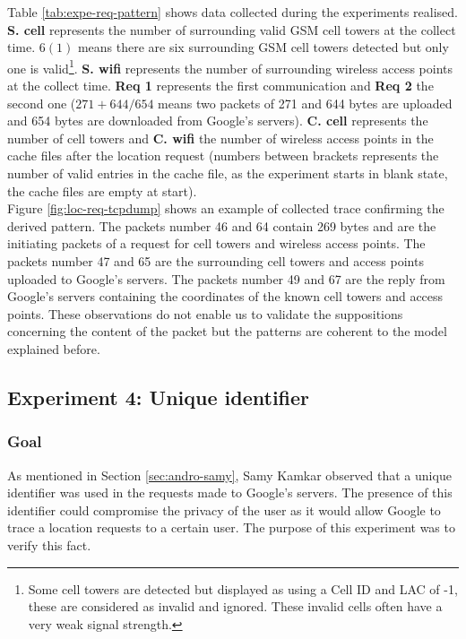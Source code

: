 Table \ref{tab:expe-req-pattern} shows data collected during the experiments realised.
\textbf{S. cell} represents the number of surrounding valid GSM cell towers at the collect time.
$6 (1)$ means there are six surrounding GSM cell towers detected but only one is valid\footnote{Some cell towers are detected but displayed as using a Cell ID and LAC of -1, these are considered as invalid and ignored. These invalid cells often have a very weak signal strength.}.
\textbf{S. wifi} represents the number of surrounding wireless access points at the collect time.
\textbf{Req 1} represents the first communication and \textbf{Req 2} the second one ($271+644/654$ means two packets of 271 and 644 bytes are uploaded and 654 bytes are downloaded from Google's servers).
\textbf{C. cell} represents the number of cell towers and \textbf{C. wifi} the number of wireless access points in the cache files after the location request (numbers between brackets represents the number of valid entries in the cache file, as the experiment starts in blank state, the cache files are empty at start).\\


Figure \ref{fig:loc-req-tcpdump} shows an example of collected trace confirming the derived pattern.
The packets number 46 and 64 contain 269 bytes and are the initiating packets of a request for cell towers and wireless access points.
The packets number 47 and 65 are the surrounding cell towers and access points uploaded to Google's servers.
The packets number 49 and 67 are the reply from Google's servers containing the coordinates of the known cell towers and access points.
These observations do not enable us to validate the suppositions concerning the content of the packet but the patterns are coherent to the model explained before.

\subsection{Experiment 4: Unique identifier}

\subsubsection{Goal}

As mentioned in Section \ref{sec:andro-samy}, Samy Kamkar observed that a unique identifier was used in the requests made to Google's servers.
The presence of this identifier could compromise the privacy of the user as it would allow Google to trace a location requests to a certain user.
The purpose of this experiment was to verify this fact.

